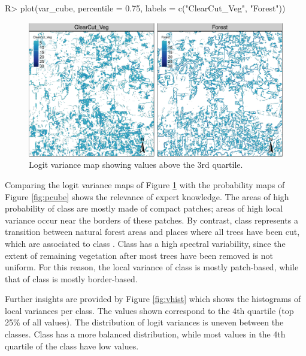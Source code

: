 \documentclass[
  shortnames]{jss}
\begin{document}
\begin{CodeChunk}
\begin{CodeInput}
R> plot(var_cube, percentile = 0.75, labels = c("ClearCut_Veg", "Forest"))
\end{CodeInput}
\begin{figure}[h]

{\centering \includegraphics{Bayesian_smoothing_JSS_files/figure-latex/vcube-1} 

}

\caption[Logit variance map showing values above the 3rd quartile]{Logit variance map showing values above the 3rd quartile.}\label{fig:vcube}
\end{figure}
\end{CodeChunk}

Comparing the logit variance maps of Figure \ref{fig:vcube} with the probability maps of Figure \ref{fig:pcube} shows the relevance of expert knowledge. The areas of high probability of class  are mostly made of compact patches; areas of high local variance occur near the borders of these patches. By contrast, class  represents a transition between natural forest areas and places where all trees have been cut, which are associated to class . Class  has a high spectral variability, since the extent of remaining vegetation after most trees have been removed is not uniform. For this reason, the local variance of class  is mostly patch-based, while that of class  is mostly border-based.

Further insights are provided by Figure \ref{fig:vhist} which shows the histograms of local variances per class. The values shown correspond to the 4th quartile (top 25\% of all values). The distribution of logit variances is uneven between the classes. Class  has a more balanced distribution, while most values in the 4th quartile of the  class have low values.
\end{document}

